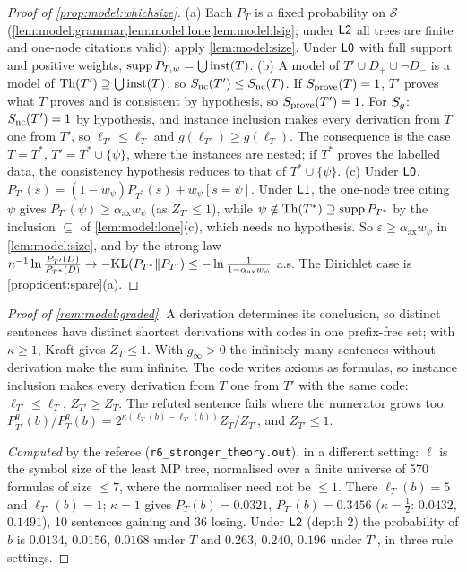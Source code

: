 \begin{proof}[Proof of \cref{prop:model:whichsize}]
(a) Each $P_T$ is a fixed probability on $\mathcal S$ (\cref{lem:model:grammar,lem:model:lone,lem:model:lsig}; under $\mathord{\mathsf{L2}}$ all trees are finite and one-node citations valid); apply \cref{lem:model:size}. Under $\mathord{\mathsf{L0}}$ with full support and positive weights, $\operatorname{supp}P_{T,w}=\bigcup\mathrm{inst}(T)$.
(b) A model of $T'\cup D_+\cup\neg D_-$ is a model of $\mathrm{Th}(T')\supseteq\bigcup\mathrm{inst}(T)$, so $S_{\mathrm{nc}}(T')\le S_{\mathrm{nc}}(T)$. If $S_{\mathrm{prove}}(T)=1$, $T'$ proves what $T$ proves and is consistent by hypothesis, so $S_{\mathrm{prove}}(T')=1$. For $S_{g}$: $S_{\mathrm{nc}}(T')=1$ by hypothesis, and instance inclusion makes every derivation from $T$ one from $T'$, so $\ell_{T'}\le\ell_T$ and $g(\ell_{T'})\ge g(\ell_T)$. The consequence is the case $T=T^*$, $T'=T^*\cup\{\psi\}$, where the instances are nested; if $T^*$ proves the labelled data, the consistency hypothesis reduces to that of $T^*\cup\{\psi\}$.
(c) Under $\mathord{\mathsf{L0}}$, $P_{T'}(s)=(1-w_\psi)P_{T^*}(s)+w_\psi[s=\psi]$. Under $\mathord{\mathsf{L1}}$, the one-node tree citing $\psi$ gives $P_{T'}(\psi)\ge\alpha_{\mathrm{ax}}w_\psi$ (as $Z_{T'}\le1$), while $\psi\notin\mathrm{Th}(T^*)\supseteq\operatorname{supp}P_{T^*}$ by the inclusion $\subseteq$ of \cref{lem:model:lone}(c), which needs no hypothesis. So $\varepsilon\ge\alpha_{\mathrm{ax}}w_\psi$ in \cref{lem:model:size}, and by the strong law $n^{-1}\ln\frac{P_{T'}(D)}{P_{T^*}(D)}\to-\mathrm{KL}(P_{T^*}\|P_{T'})\le-\ln\frac1{1-\alpha_{\mathrm{ax}}w_\psi}$ a.s. The Dirichlet case is \cref{prop:ident:spare}(a).
\end{proof}

\begin{proof}[Proof of \cref{rem:model:graded}]
A derivation determines its conclusion, so distinct sentences have distinct shortest derivations with codes in one prefix-free set; with $\kappa\ge1$, Kraft gives $Z_T\le1$. With $g_\infty>0$ the infinitely many sentences without derivation make the sum infinite. The code writes axioms as formulas, so instance inclusion makes every derivation from $T$ one from $T'$ with the same code: $\ell_{T'}\le\ell_T$, $Z_{T'}\ge Z_T$. The refuted sentence fails where the numerator grows too: $P^g_{T'}(b)/P^g_T(b)=2^{\kappa(\ell_T(b)-\ell_{T'}(b))}Z_T/Z_{T'}$, and $Z_{T'}\le1$.

\emph{Computed} by the referee (\texttt{r6\_stronger\_theory.out}), in a different setting: $\ell$ is the symbol size of the least MP tree, normalised over a finite universe of 570 formulas of size $\le7$, where the normaliser need not be $\le1$. There $\ell_T(b)=5$ and $\ell_{T'}(b)=1$; $\kappa=1$ gives $P_T(b)=0.0321$, $P_{T'}(b)=0.3456$ ($\kappa=\tfrac12$: $0.0432$, $0.1491$), 10 sentences gaining and 36 losing. Under $\mathord{\mathsf{L2}}$ (depth 2) the probability of $b$ is $0.0134$, $0.0156$, $0.0168$ under $T$ and $0.263$, $0.240$, $0.196$ under $T'$, in three rule settings.
\end{proof}

